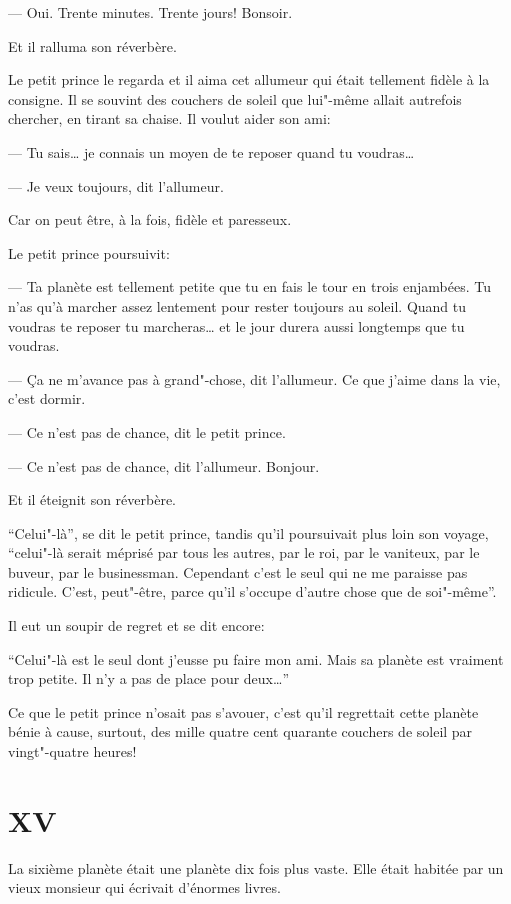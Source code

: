 \begin{Parallel}[p]{}{}
{--- Oui. Trente minutes. Trente jours! Bonsoir.

Et il ralluma son réverbère.

Le petit prince le regarda et il aima cet allumeur
qui était tellement fidèle à la consigne. Il se souvint
des couchers de soleil que lui"-même allait autrefois
chercher, en tirant sa chaise. Il voulut aider son
ami:

--- Tu sais\ldots{} je connais un moyen de te reposer
quand tu voudras\ldots{}

--- Je veux toujours, dit l'allumeur.

Car on peut être, à la fois, fidèle et paresseux.

Le petit prince poursuivit:

--- Ta planète est tellement petite que tu en fais le
tour en trois enjambées. Tu n'as qu'à marcher assez
lentement pour rester toujours au soleil. Quand tu
voudras te reposer tu marcheras\ldots{} et le jour durera
aussi longtemps que tu voudras.

--- Ça ne m'avance pas à grand"-chose, dit l'allumeur. Ce que j'aime dans la vie, c'est dormir.

--- Ce n'est pas de chance, dit le petit prince.

--- Ce n'est pas de chance, dit l'allumeur. Bonjour.

Et il éteignit son réverbère.

``Celui"-là'', se dit le petit prince, tandis qu'il poursuivait plus loin son voyage, ``celui"-là serait méprisé
par tous les autres, par le roi, par le vaniteux, par le
buveur, par le businessman. Cependant c'est le seul
qui ne me paraisse pas ridicule. C'est, peut"-être, parce qu'il s'occupe d'autre chose que de soi"-même''.

Il eut un soupir de regret et se dit encore:

``Celui"-là est le seul dont j'eusse pu faire mon ami.
Mais sa planète est vraiment trop petite. Il n'y a pas
de place pour deux\ldots{}''

Ce que le petit prince n'osait pas s'avouer, c'est
qu'il regrettait cette planète bénie à cause, surtout,
des mille quatre cent quarante couchers de soleil
par vingt"-quatre heures!

\section{XV}

La sixième planète était une planète dix fois plus
vaste. Elle était habitée par un vieux monsieur qui
écrivait d'énormes livres.

}
\end{Parallel}
